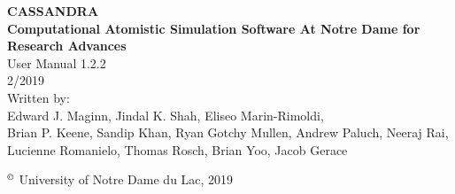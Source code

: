 \begin{center}
\vspace*{2 in}
{\huge{\bf CASSANDRA} }\\
\vspace{0.5in}
{\huge { \bf  Computational Atomistic Simulation Software At Notre Dame for Research Advances}} \\
\vspace{1 in}
User Manual 1.2.2 \\
\vspace{.2 in}
2/2019 \\
\vspace{0.2in}
Written by: \\
\vspace{0.2in}
Edward J. Maginn, Jindal K. Shah, Eliseo Marin-Rimoldi, \\
Brian P. Keene, Sandip Khan, Ryan Gotchy Mullen, Andrew Paluch,
Neeraj Rai, Lucienne Romanielo, Thomas Rosch, Brian Yoo, Jacob Gerace
\end{center}
\vspace{1.0in}
$^\copyright$ University of Notre Dame du Lac, 2019
